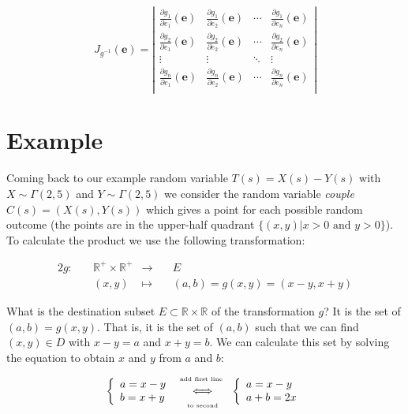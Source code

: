 \documentclass{article}
\newcommand\R{{\mathbb R} }
\begin{document}

\newcommand\e{{\mathbf e}}
        \renewcommand\arraystretch{2}
$$        J_{g^{-1}}(\e) = \left|\begin{array}{lllll}
            \frac{\partial g_1}{\partial e_1}(\e) & \frac{\partial g_1}{\partial e_2}(\e) & \cdots & \frac{\partial g_1}{\partial e_n}(\e)\\
            \frac{\partial g_2}{\partial e_1}(\e) & \frac{\partial g_2}{\partial e_2}(\e) & \cdots & \frac{\partial g_2}{\partial e_n}(\e)\\
            \vdots & \vdots & \ddots & \vdots \\
            \frac{\partial g_n}{\partial e_1}(\e) & \frac{\partial g_n}{\partial e_2}(\e) & \cdots & \frac{\partial g_n}{\partial e_n}(\e)\\
        \end{array}\right| $$

\section{Example}

Coming back to our example random variable $T(s)=X(s)-Y(s)$ with $X\sim \Gamma(2,5)$ and $Y\sim \Gamma(2,5)$ we consider the random variable {\it couple} $C(s) = (X(s), Y(s))$ which gives a point for each possible random outcome (the points are in the upper-half quadrant $\{(x,y)| x>0 \mbox{ and } y>0\}$). To calculate the product we use the following transformation:

\begin{alignat*}{2}
g:\quad & \R^+ \times \R^+ &\longrightarrow \quad & E \\
& (x,y) & \mapsto\quad & (a,b) = g(x,y) = (x-y, x+y) 
\end{alignat*}


What is the destination subset $E\subset \R \times \R$ of the transformation $g$? It is the set of $(a,b)=g(x,y)$. That is, it is the set of $(a,b)$ such that we can find $(x,y)\in D$ with $x-y = a$ and $x+y= b$. We can calculate this set by solving the equation to obtain $x$ and $y$ from $a$ and $b$:
\renewcommand\arraystretch{1.2}
$$
\left\{\begin{array}{l} a = x-y\\ b = x+y \end{array}\right. 
\begin{array}{c}\mbox{\tiny add first line }\\\Longleftrightarrow\\\mbox{\tiny to second}\end{array}
\left\{\begin{array}{l} a = x-y\\ a+b = 2x\end{array}\right.$$
\end{document}
